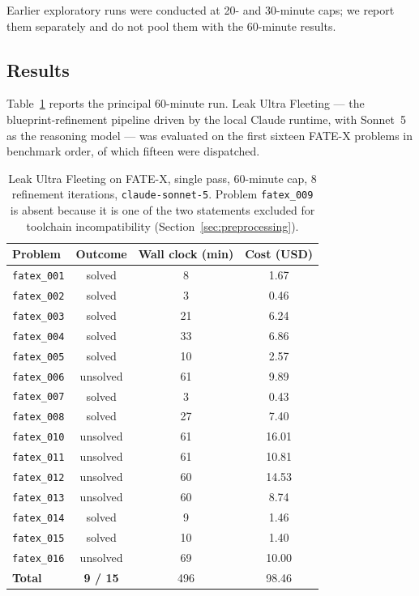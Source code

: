\documentclass[12pt, a4paper]{article}
\begin{document}
Earlier exploratory runs were conducted at 20- and 30-minute caps; we report
them separately and do not pool them with the 60-minute results.

\subsection{Results}

Table~\ref{tab:fatex-headline} reports the principal 60-minute run. Leak
Ultra Fleeting --- the blueprint-refinement pipeline driven by the local
Claude runtime, with Sonnet~5~\cite{anthropic2026sonnet5} as the reasoning
model --- was evaluated on the first sixteen FATE-X problems in benchmark
order, of which fifteen were dispatched.

\begin{table}[H]
  \centering
  \caption{Leak Ultra Fleeting on FATE-X, single pass, 60-minute cap,
  8 refinement iterations, \texttt{claude-sonnet-5}. Problem
  \texttt{fatex\_009} is absent because it is one of the two statements
  excluded for toolchain incompatibility (Section~\ref{sec:preprocessing}).}
  \label{tab:fatex-headline}
  \renewcommand{\arraystretch}{1.25}
  \begin{tabular}{lccc}
    \toprule
    Problem & Outcome & Wall clock (min) & Cost (USD) \\
    \midrule
    \texttt{fatex\_001} & solved   & 8  & 1.67 \\
    \texttt{fatex\_002} & solved   & 3  & 0.46 \\
    \texttt{fatex\_003} & solved   & 21 & 6.24 \\
    \texttt{fatex\_004} & solved   & 33 & 6.86 \\
    \texttt{fatex\_005} & solved   & 10 & 2.57 \\
    \texttt{fatex\_006} & unsolved & 61 & 9.89 \\
    \texttt{fatex\_007} & solved   & 3  & 0.43 \\
    \texttt{fatex\_008} & solved   & 27 & 7.40 \\
    \texttt{fatex\_010} & unsolved & 61 & 16.01 \\
    \texttt{fatex\_011} & unsolved & 61 & 10.81 \\
    \texttt{fatex\_012} & unsolved & 60 & 14.53 \\
    \texttt{fatex\_013} & unsolved & 60 & 8.74 \\
    \texttt{fatex\_014} & solved   & 9  & 1.46 \\
    \texttt{fatex\_015} & solved   & 10 & 1.40 \\
    \texttt{fatex\_016} & unsolved & 69 & 10.00 \\
    \midrule
    \textbf{Total} & \textbf{9 / 15} & 496 & 98.46 \\
    \bottomrule
  \end{tabular}
\end{table}
\end{document}
